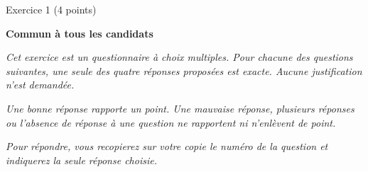 
%
\begin{h2}Exercice 1 (4 points)\end{h2}
\textbf{Commun à  tous les candidats}
\par
\emph{Cet exercice est un questionnaire à choix multiples. Pour chacune des questions
     suivantes, une seule des quatre réponses proposées est exacte. Aucune justification
n'est demandée.}
\par
\textit{Une bonne réponse rapporte un point. Une mauvaise réponse,
     plusieurs réponses ou l'absence de réponse à une question ne rapportent ni
n'enlèvent de point.}
\par
\textit{Pour répondre, vous recopierez sur votre copie le numéro de la question et indiquerez la seule réponse choisie.}
\bigskip

